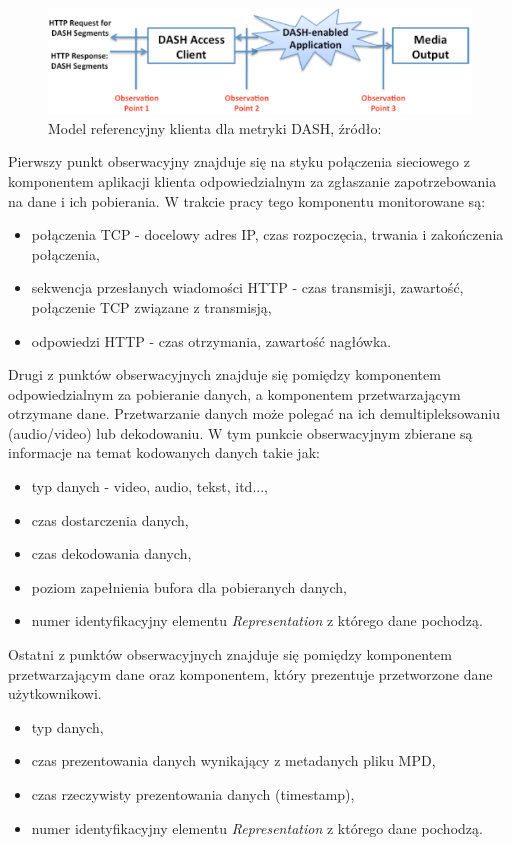 \begin{figure}[h!]
	\centering
		\includegraphics[width=\linewidth]{clientmodel}
	\caption{Model referencyjny klienta dla metryki DASH, źródło:~\cite{ISO-IEC-DASH}}
	\label{fig:clientmodel}
\end{figure}

Pierwszy punkt obserwacyjny znajduje się na styku połączenia sieciowego z komponentem aplikacji klienta odpowiedzialnym za zgłaszanie zapotrzebowania na dane i ich pobierania. W trakcie pracy tego komponentu monitorowane są:
\begin{itemize}
\item połączenia TCP - docelowy adres IP, czas rozpoczęcia, trwania i zakończenia połączenia,
\item sekwencja przesłanych wiadomości HTTP - czas transmisji, zawartość, połączenie TCP związane z transmisją,
\item odpowiedzi HTTP - czas otrzymania, zawartość nagłówka.
\end{itemize}

Drugi z punktów obserwacyjnych znajduje się pomiędzy komponentem odpowiedzialnym za pobieranie danych, a komponentem przetwarzającym otrzymane dane. Przetwarzanie danych może polegać na ich demultipleksowaniu (audio/video) lub dekodowaniu. W tym punkcie obserwacyjnym zbierane są informacje na temat kodowanych danych takie jak:
\begin{itemize}
\item typ danych - video, audio, tekst, itd...,
\item czas dostarczenia danych,
\item czas dekodowania danych,
\item poziom zapełnienia bufora dla pobieranych danych,
\item numer identyfikacyjny elementu \textit{Representation} z którego dane pochodzą.
\end{itemize} 

Ostatni z punktów obserwacyjnych znajduje się pomiędzy komponentem przetwarzającym dane oraz komponentem, który prezentuje przetworzone dane użytkownikowi.
\begin{itemize}
\item typ danych,
\item czas prezentowania danych wynikający z metadanych pliku MPD,
\item czas rzeczywisty prezentowania danych (timestamp),
\item numer identyfikacyjny elementu \textit{Representation} z którego dane pochodzą.
\end{itemize}

